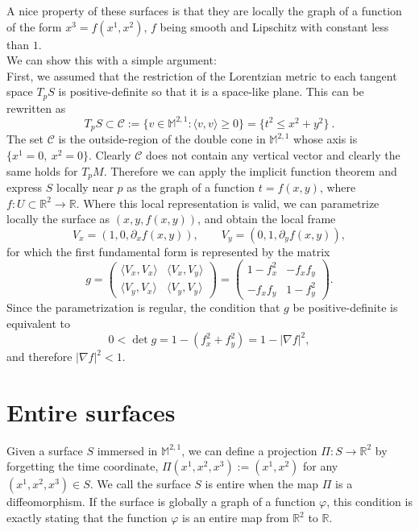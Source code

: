 \documentclass[a4paper,11pt,openright,twoside]{book}
\newcommand{\R}{\mathbb{R}}
\newcommand{\M}{\mathbb{M}^{2,1}}
\newcommand{\1}{\mathds{1}}
\theoremstyle{plain}
\theoremstyle{definition}
\theoremstyle{remark}
\begin{document}
A nice property of these surfaces is that they are locally the graph of a function of the form $x^3 = f(x^1,x^2)$, $f$ being smooth and Lipschitz with constant less than $1$.\\
We can show this with a simple argument:\\
First, we assumed that the restriction of the Lorentzian metric to each tangent space $T_pS$ is positive-definite so that it is a space-like plane. This can be rewritten as
\[
T_pS \subset \mathscr{C}:=\{v\in \M:\langle v,v\rangle \ge 0\}
=\{t^2\le x^2+y^2\}\ .
\]
The set $\mathscr{C}$ is the outside-region of the double cone in $\M$ whose axis is $\{x^1=0,\ x^2=0\}$. Clearly $\mathscr{C}$ does not contain any vertical vector and clearly the same holds for $T_pM$. 
Therefore we can apply the implicit function theorem and express $S$ locally near $p$ as the graph of a function $t=f(x,y)$, where $f:U\subset \R^2\to \R$.
Where this local representation is valid, we can parametrize locally the surface as $(x,y,f(x,y))$, and obtain the local frame
\[
V_x=(1,0,\partial_x f(x,y)), \qquad V_y=(0,1,\partial_y f(x,y)),
\]
for which the first fundamental form is represented by the matrix
\[
g=
\begin{pmatrix}
\langle V_x,V_x\rangle & \langle V_x,V_y\rangle\\
\langle V_y,V_x\rangle & \langle V_y,V_y\rangle
\end{pmatrix}
=
\begin{pmatrix}
1-f_x^2 & -f_xf_y\\
-f_xf_y & 1-f_y^2
\end{pmatrix}.
\]
Since the parametrization is regular, the condition that $g$ be positive-definite is equivalent to
\[
0<\det g = 1-(f_x^2+f_y^2)=1-|\nabla f|^2,
\]
and therefore $|\nabla f|^2<1$.
\section{Entire surfaces}%
Given a surface $S$ immersed in  $\M$, we can define a projection $\Pi:S\to \R^2$ by forgetting the time coordinate, $\Pi(x^1,x^2,x^3):=(x^1,x^2)$ for any $(x^1,x^2,x^3)\in S$. We call the surface $S$ is entire when the map $\Pi$ is a diffeomorphism. If the surface is globally a graph of a function $\varphi$, this condition is exactly stating that the function $\varphi$ is an entire map from $\R^2$ to $\R$.\\
\end{document}
